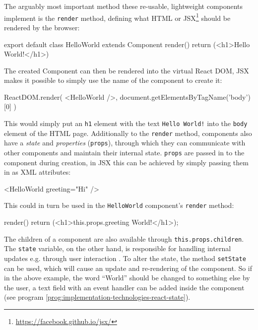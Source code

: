The arguably most important method these re-usable, lightweight components implement is the \texttt{render} method, defining what HTML or JSX\footnote{\url{https://facebook.github.io/jsx/}} should be rendered by the browser:
\begin{JsCode}
export default class HelloWorld extends Component {
  render() {
    return (<h1>Hello World!</h1>)
  }
}
\end{JsCode}
%
The created Component can then be rendered into the virtual React DOM, JSX makes it possible to simply use the name of the component to create it:
%
\begin{JsCode}
ReactDOM.render(
  <HelloWorld />,
  document.getElementsByTagName('body')[0]
)
\end{JsCode}
%
This would simply put an \texttt{h1} element with the text \texttt{Hello World!} into the \texttt{body} element of the HTML page. Additionally to the \texttt{render} method, components also have a \emph{state} and \emph{properties} (\texttt{props}), through which they can communicate with other components and maintain their internal state. \texttt{props} are passed in to the component during creation, in JSX this can be achieved by simply passing them in as XML attributes:
%
\begin{JsCode}
  <HelloWorld greeting="Hi" />
\end{JsCode}
%
This could in turn be used in the \texttt{HelloWorld} component's \texttt{render} method:
%
\begin{JsCode}
  render() {
    return (<h1>{this.props.greeting} World!</h1>);
  }
\end{JsCode}
%
The children of a component are also available through \texttt{this.props.children}. The \texttt{state} variable, on the other hand, is responsible for handling internal updates e.g. through user interaction \cite{react-docu}. To alter the state, the method \texttt{setState} can be used, which will cause an update and re-rendering of the component. So if in the above example, the word ``World'' should be changed to something else by the user, a text field with an event handler can be added inside the component (see program \ref{prog:implementation-technologies-react-state}).
%
